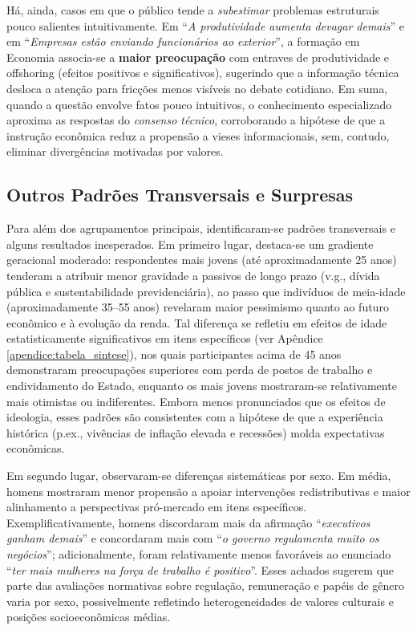 Há, ainda, casos em que o público tende a \textit{subestimar} problemas estruturais pouco salientes intuitivamente. Em ``\textit{A produtividade aumenta devagar demais}'' e em ``\textit{Empresas estão enviando funcionários ao exterior}'', a formação em Economia associa-se a \textbf{maior preocupação} com entraves de produtividade e offshoring (efeitos positivos e significativos), sugerindo que a informação técnica desloca a atenção para fricções menos visíveis no debate cotidiano. Em suma, quando a questão envolve fatos pouco intuitivos, o conhecimento especializado aproxima as respostas do \textit{consenso técnico}, corroborando a hipótese de que a instrução econômica reduz a propensão a vieses informacionais, sem, contudo, eliminar divergências motivadas por valores.

\subsection{Outros Padrões Transversais e Surpresas}
Para além dos agrupamentos principais, identificaram-se padrões transversais e alguns resultados inesperados. Em primeiro lugar, destaca-se um gradiente geracional moderado: respondentes mais jovens (até aproximadamente 25 anos) tenderam a atribuir menor gravidade a passivos de longo prazo (v.g., dívida pública e sustentabilidade previdenciária), ao passo que indivíduos de meia-idade (aproximadamente 35--55 anos) revelaram maior pessimismo quanto ao futuro econômico e à evolução da renda. Tal diferença se refletiu em efeitos de idade estatisticamente significativos em itens específicos (ver Apêndice \autoref{apendice:tabela_sintese}), nos quais participantes acima de 45 anos demonstraram preocupações superiores com perda de postos de trabalho e endividamento do Estado, enquanto os mais jovens mostraram-se relativamente mais otimistas ou indiferentes. Embora menos pronunciados que os efeitos de ideologia, esses padrões são consistentes com a hipótese de que a experiência histórica (p.ex., vivências de inflação elevada e recessões) molda expectativas econômicas.

Em segundo lugar, observaram-se diferenças sistemáticas por sexo. Em média, homens mostraram menor propensão a apoiar intervenções redistributivas e maior alinhamento a perspectivas pró-mercado em itens específicos. Exemplificativamente, homens discordaram mais da afirmação ``\textit{executivos ganham demais}'' e concordaram mais com ``\textit{o governo regulamenta muito os negócios}''; adicionalmente, foram relativamente menos favoráveis ao enunciado ``\textit{ter mais mulheres na força de trabalho é positivo}''. Esses achados sugerem que parte das avaliações normativas sobre regulação, remuneração e papéis de gênero varia por sexo, possivelmente refletindo heterogeneidades de valores culturais e posições socioeconômicas médias.

